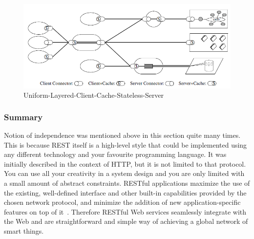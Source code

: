 



\begin{center}
 \begin{figure}[h]
	\includegraphics[width=\textwidth]{../images/background/Uniform-Layered-Client-Cache-Stateless-Server.png}
	\caption{Uniform-Layered-Client-Cache-Stateless-Server ~\cite{Fielding2000} }
	\label{fig:Uniform-Layered-Client-Cache-Stateless-Server}
 \end{figure}
\end{center}

\subsubsection{Summary}
Notion of independence was mentioned above in this section quite many times.
This is because REST itself is a high-level style that could be implemented
using any different technology and your favourite programming language. It was initially described in the context
of HTTP, but it is not limited to that protocol. 
You can use all your creativity in a system design and you are only limited with a small amount of abstract constraints. 
 RESTful applications maximize the use of the existing, well-defined interface
and other built-in capabilities provided by the chosen network protocol,
and minimize the addition of new application-specific features on top of
it~\cite{rest_brief_intro}. Therefore RESTful Web services seamlessly integrate with the
Web and are straightforward and simple way of achieving a global network of
smart things.

